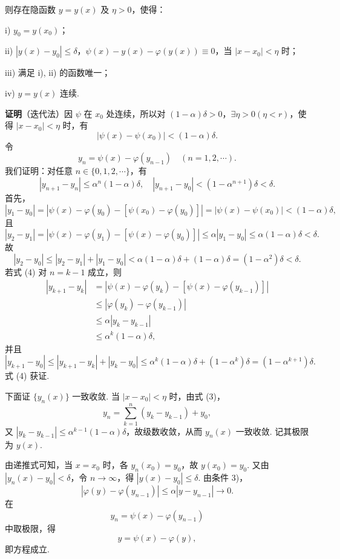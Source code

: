 \documentclass[UTF8,12pt,a4paper,fontset=fandol]{ctexart}
\begin{document}
\noindent 则存在隐函数 $y=y(x)$ 及 $\eta>0$，使得：

i) $y_0=y(x_0)$；

ii) $|y(x)-y_0|\le\delta$，$\psi(x)-y(x)-\varphi(y(x))\equiv0$，当 $|x-x_0|<\eta$ 时；

iii) 满足 i), ii) 的函数唯一；

iv) $y=y(x)$ 连续.

\noindent\textbf{证明}\quad （迭代法）因 $\psi$ 在 $x_0$ 处连续，所以对 $(1-\alpha)\delta>0$，$\exists\eta>0(\eta<r)$，使得 $|x-x_0|<\eta$ 时，有
\begin{equation}
  |\psi(x)-\psi(x_0)|<(1-\alpha)\delta.
\end{equation}
令
\begin{equation}
  y_n=\psi(x)-\varphi(y_{n-1})\quad(n=1,2,\cdots).
\end{equation}
我们证明：对任意 $n\in\{0,1,2,\cdots\}$，有
\begin{equation}
  |y_{n+1}-y_n|\le\alpha^n(1-\alpha)\delta,\quad
  |y_{n+1}-y_0|<(1-\alpha^{n+1})\delta<\delta.
\end{equation}
首先，
\[
  |y_1-y_0|
  =
  |\psi(x)-\varphi(y_0)-[\psi(x_0)-\varphi(y_0)]|
  =
  |\psi(x)-\psi(x_0)|
  <
  (1-\alpha)\delta,
\]
且
\[
  |y_2-y_1|
  =
  |\psi(x)-\varphi(y_1)-[\psi(x)-\varphi(y_0)]|
  \le
  \alpha|y_1-y_0|
  \le
  \alpha(1-\alpha)\delta<\delta.
\]
故
\[
  |y_2-y_0|\le |y_2-y_1|+|y_1-y_0|
  <
  \alpha(1-\alpha)\delta+(1-\alpha)\delta
  =
  (1-\alpha^2)\delta<\delta.
\]
若式 (4) 对 $n=k-1$ 成立，则
\[
\begin{aligned}
  |y_{k+1}-y_k|
  &=
  |\psi(x)-\varphi(y_k)-[\psi(x)-\varphi(y_{k-1})]| \\
  &\le |\varphi(y_k)-\varphi(y_{k-1})|              \\
  &\le \alpha|y_k-y_{k-1}|                          \\
  &\le \alpha^k(1-\alpha)\delta,
\end{aligned}
\]
并且
\[
  |y_{k+1}-y_0|
  \le |y_{k+1}-y_k|+|y_k-y_0|
  \le \alpha^k(1-\alpha)\delta+(1-\alpha^k)\delta
  =
  (1-\alpha^{k+1})\delta.
\]
式 (4) 获证.

下面证 $\{y_n(x)\}$ 一致收敛. 当 $|x-x_0|<\eta$ 时，由式 (3)，
\[
  y_n=\sum_{k=1}^n(y_k-y_{k-1})+y_0,
\]
又 $|y_k-y_{k-1}|\le\alpha^{k-1}(1-\alpha)\delta$，故级数收敛，从而 $y_n(x)$ 一致收敛. 记其极限为 $y(x)$.

由递推式可知，当 $x=x_0$ 时，各 $y_n(x_0)=y_0$，故 $y(x_0)=y_0$. 又由 $|y_n(x)-y_0|<\delta$，令 $n\to\infty$，得 $|y(x)-y_0|\le\delta$. 由条件 3)，
\[
  |\varphi(y)-\varphi(y_{n-1})|\le\alpha|y-y_{n-1}|\to0.
\]
在
\[
  y_n=\psi(x)-\varphi(y_{n-1})
\]
中取极限，得
\[
  y=\psi(x)-\varphi(y),
\]
即方程成立.
\end{document}
